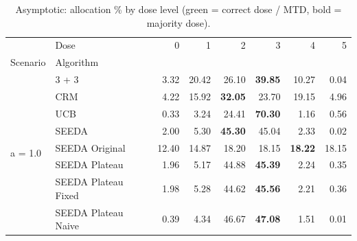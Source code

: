 \begin{table}[H]
\centering
\caption{Asymptotic: allocation \% by dose level (green = correct dose / MTD, bold = majority dose).}
\label{tab:asym_alloc_by_dose}
\begin{tabular}{llrrrrrr}
\toprule
 & Dose & 0 & 1 & 2 & 3 & 4 & 5 \\
Scenario & Algorithm &  &  &  &  &  &  \\
\midrule
\multirow[c]{8}{*}{a = 1.0} & 3 + 3 & 3.32 & 20.42 & {\cellcolor[HTML]{C8E6C9}} 26.10 & \bfseries 39.85 & 10.27 & 0.04 \\
 & CRM & 4.22 & 15.92 & {\cellcolor[HTML]{C8E6C9}} \bfseries 32.05 & 23.70 & 19.15 & 4.96 \\
 & UCB & 0.33 & 3.24 & {\cellcolor[HTML]{C8E6C9}} 24.41 & \bfseries 70.30 & 1.16 & 0.56 \\
 & SEEDA & 2.00 & 5.30 & {\cellcolor[HTML]{C8E6C9}} \bfseries 45.30 & 45.04 & 2.33 & 0.02 \\
 & SEEDA Original & 12.40 & 14.87 & {\cellcolor[HTML]{C8E6C9}} 18.20 & 18.15 & \bfseries 18.22 & 18.15 \\
 & SEEDA Plateau & 1.96 & 5.17 & {\cellcolor[HTML]{C8E6C9}} 44.88 & \bfseries 45.39 & 2.24 & 0.35 \\
 & SEEDA Plateau Fixed & 1.98 & 5.28 & {\cellcolor[HTML]{C8E6C9}} 44.62 & \bfseries 45.56 & 2.21 & 0.36 \\
 & SEEDA Plateau Naive & 0.39 & 4.34 & {\cellcolor[HTML]{C8E6C9}} 46.67 & \bfseries 47.08 & 1.51 & 0.01 \\
\bottomrule
\end{tabular}
\end{table}
